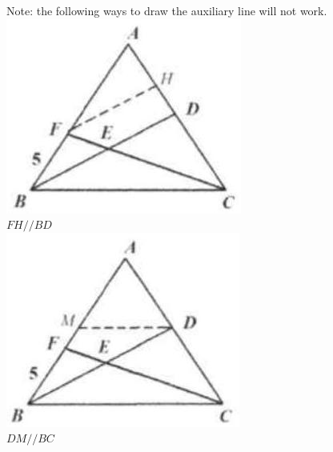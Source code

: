 \documentclass{article}
\begin{document}
Note: the following ways to draw the auxiliary line will not work.\\
\centering
\includegraphics[width=\textwidth]{images/103.jpg}\\
\(F H / / B D\)\\
\centering
\includegraphics[width=\textwidth]{images/103(5).jpg}\\
\(D M / / B C\)\\
\centering
\end{document}

